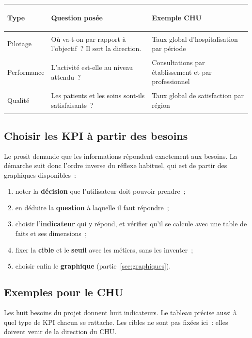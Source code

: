 \begin{center}
\small
\begin{tabularx}{\textwidth}{>{\bfseries\raggedright\arraybackslash}p{2.6cm} >{\raggedright\arraybackslash}X >{\raggedright\arraybackslash}X}
\toprule
Type & Question posée & Exemple CHU \\
\midrule
Pilotage & Où va-t-on par rapport à l'objectif~? Il sert la direction. & Taux global d'hospitalisation par période \\
Performance & L'activité est-elle au niveau attendu~? & Consultations par établissement et par professionnel \\
Qualité & Les patients et les soins sont-ils satisfaisants~? & Taux global de satisfaction par région \\
\bottomrule
\end{tabularx}
\end{center}

\subsection{Choisir les KPI à partir des besoins}

\noindent Le prosit demande que les informations répondent exactement aux besoins. La démarche suit donc l'ordre inverse du réflexe habituel, qui est de partir des graphiques disponibles~:
\begin{enumerate}
	\item noter la \textbf{décision} que l'utilisateur doit pouvoir prendre~;
	\item en déduire la \textbf{question} à laquelle il faut répondre~;
	\item choisir l'\textbf{indicateur} qui y répond, et vérifier qu'il se calcule avec une table de faits et ses dimensions~;
	\item fixer la \textbf{cible} et le \textbf{seuil} avec les métiers, sans les inventer~;
	\item choisir enfin le \textbf{graphique} (partie~\ref{sec:graphiques}).
\end{enumerate}

\subsection{Exemples pour le CHU}

\noindent Les huit besoins du projet donnent huit indicateurs. Le tableau précise aussi à quel type de KPI chacun se rattache. Les cibles ne sont pas fixées ici~: elles doivent venir de la direction du CHU.

